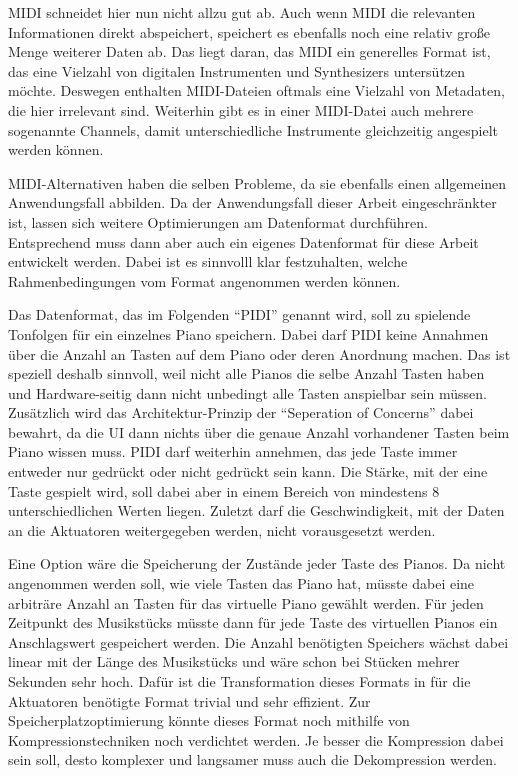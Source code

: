 MIDI schneidet hier nun nicht allzu gut ab.
Auch wenn MIDI die relevanten Informationen direkt abspeichert, speichert es ebenfalls noch eine relativ große Menge weiterer Daten ab.
Das liegt daran, das MIDI ein generelles Format ist, das eine Vielzahl von digitalen Instrumenten und Synthesizers untersützen möchte.
Deswegen enthalten MIDI-Dateien oftmals eine Vielzahl von Metadaten, die hier irrelevant sind.
Weiterhin gibt es in einer MIDI-Datei auch mehrere sogenannte Channels, damit unterschiedliche Instrumente gleichzeitig angespielt werden können.

MIDI-Alternativen haben die selben Probleme, da sie ebenfalls einen allgemeinen Anwendungsfall abbilden.
Da der Anwendungsfall dieser Arbeit eingeschränkter ist, lassen sich weitere Optimierungen am Datenformat durchführen.
Entsprechend muss dann aber auch ein eigenes Datenformat für diese Arbeit entwickelt werden.
Dabei ist es sinnvolll klar festzuhalten, welche Rahmenbedingungen vom Format angenommen werden können.

Das Datenformat, das im Folgenden \enquote{\ac{PIDI}} genannt wird, soll zu spielende Tonfolgen für ein einzelnes Piano speichern.
Dabei darf \ac{PIDI} keine Annahmen über die Anzahl an Tasten auf dem Piano oder deren Anordnung machen.
Das ist speziell deshalb sinnvoll, weil nicht alle Pianos die selbe Anzahl Tasten haben und Hardware-seitig dann nicht unbedingt alle Tasten anspielbar sein müssen.
Zusätzlich wird das Architektur-Prinzip der \enquote{Seperation of Concerns} dabei bewahrt, da die \ac{UI} dann nichts über die genaue Anzahl vorhandener Tasten beim Piano wissen muss.
\ac{PIDI} darf weiterhin annehmen, das jede Taste immer entweder nur gedrückt oder nicht gedrückt sein kann.
Die Stärke, mit der eine Taste gespielt wird, soll dabei aber in einem Bereich von mindestens 8 unterschiedlichen Werten liegen.
Zuletzt darf die Geschwindigkeit, mit der Daten an die Aktuatoren weitergegeben werden, nicht vorausgesetzt werden.

Eine Option wäre die Speicherung der Zustände jeder Taste des Pianos.
Da nicht angenommen werden soll, wie viele Tasten das Piano hat, müsste dabei eine arbiträre Anzahl an Tasten für das virtuelle Piano gewählt werden.
Für jeden Zeitpunkt des Musikstücks müsste dann für jede Taste des virtuellen Pianos ein Anschlagswert gespeichert werden.
Die Anzahl benötigten Speichers wächst dabei linear mit der Länge des Musikstücks und wäre schon bei Stücken mehrer Sekunden sehr hoch.
Dafür ist die Transformation dieses Formats in für die Aktuatoren benötigte Format trivial und sehr effizient.
Zur Speicherplatzoptimierung könnte dieses Format noch mithilfe von Kompressionstechniken noch verdichtet werden.
Je besser die Kompression dabei sein soll, desto komplexer und langsamer muss auch die Dekompression werden.

